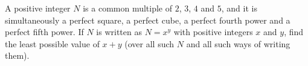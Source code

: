 A positive integer $N$ is a common multiple of $2$, $3$, $4$ and $5$, and it is simultaneously a perfect square, a perfect cube, a perfect fourth power and a perfect fifth power. If $N$ is written as $N=x^y$ with positive integers $x$ and $y$, find the least possible value of $x+y$ (over all such $N$ and all such ways of writing them).
